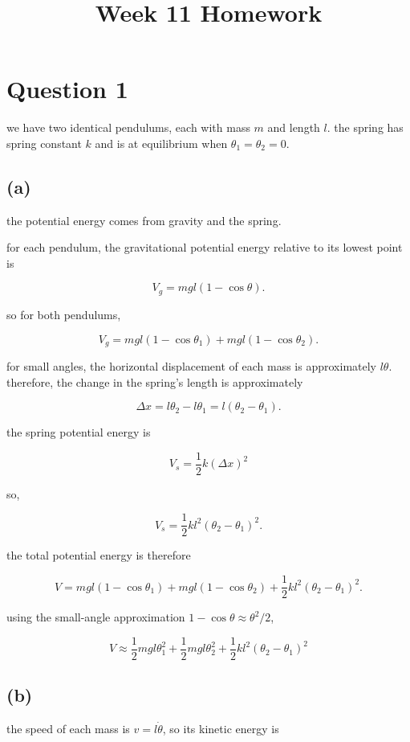 \documentclass{article}
\title{Week 11 Homework}
\date{}
\begin{document}
\maketitle

\section*{Question 1}

we have two identical pendulums, each with mass $m$ and length $l$. the spring has spring constant $k$ and is at equilibrium when $\theta_1=\theta_2=0$.

\subsection*{(a)}

the potential energy comes from gravity and the spring.

for each pendulum, the gravitational potential energy relative to its lowest point is

\[
V_g=mgl(1-\cos\theta).
\]

so for both pendulums,

\[
V_g=mgl(1-\cos\theta_1)+mgl(1-\cos\theta_2).
\]

for small angles, the horizontal displacement of each mass is approximately $l\theta$. therefore, the change in the spring's length is approximately

\[
\Delta x=l\theta_2-l\theta_1
=l(\theta_2-\theta_1).
\]

the spring potential energy is

\[
V_s=\frac{1}{2}k(\Delta x)^2
\]

so,

\[
V_s=\frac{1}{2}kl^2(\theta_2-\theta_1)^2.
\]

the total potential energy is therefore

\[
V=mgl(1-\cos\theta_1)+mgl(1-\cos\theta_2)
+\frac{1}{2}kl^2(\theta_2-\theta_1)^2.
\]

using the small-angle approximation $1-\cos\theta\approx\theta^2/2$,

\[
\boxed{
V\approx\frac{1}{2}mgl\theta_1^2
+\frac{1}{2}mgl\theta_2^2
+\frac{1}{2}kl^2(\theta_2-\theta_1)^2
}
\]

\subsection*{(b)}

the speed of each mass is $v=l\dot{\theta}$, so its kinetic energy is
\end{document}
